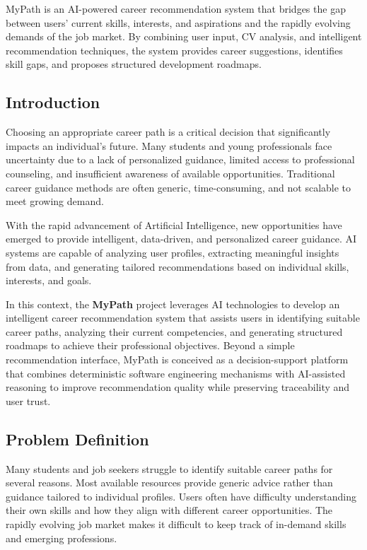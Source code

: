 \documentclass[12pt,a4paper]{article}
\begin{document}
MyPath is an AI-powered career recommendation system that bridges the gap between users' current skills, interests, and aspirations and the rapidly evolving demands of the job market. By combining user input, CV analysis, and intelligent recommendation techniques, the system provides career suggestions, identifies skill gaps, and proposes structured development roadmaps.

\subsection{Introduction}

Choosing an appropriate career path is a critical decision that significantly impacts an individual's future. Many students and young professionals face uncertainty due to a lack of personalized guidance, limited access to professional counseling, and insufficient awareness of available opportunities. Traditional career guidance methods are often generic, time-consuming, and not scalable to meet growing demand.

With the rapid advancement of Artificial Intelligence, new opportunities have emerged to provide intelligent, data-driven, and personalized career guidance. AI systems are capable of analyzing user profiles, extracting meaningful insights from data, and generating tailored recommendations based on individual skills, interests, and goals.

In this context, the \textbf{MyPath} project leverages AI technologies to develop an intelligent career recommendation system that assists users in identifying suitable career paths, analyzing their current competencies, and generating structured roadmaps to achieve their professional objectives. Beyond a simple recommendation interface, MyPath is conceived as a decision-support platform that combines deterministic software engineering mechanisms with AI-assisted reasoning to improve recommendation quality while preserving traceability and user trust.

\subsection{Problem Definition}

Many students and job seekers struggle to identify suitable career paths for several reasons. Most available resources provide generic advice rather than guidance tailored to individual profiles. Users often have difficulty understanding their own skills and how they align with different career opportunities. The rapidly evolving job market makes it difficult to keep track of in-demand skills and emerging professions.
\end{document}
